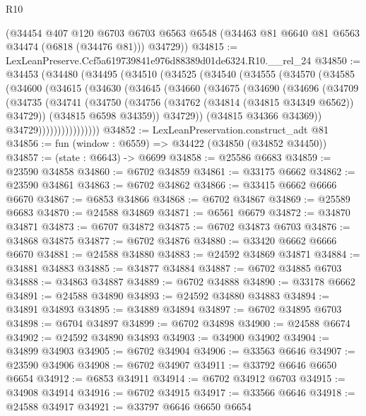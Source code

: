 \begin{lexlean}{R10}
\begin{coremodule}
      (@34454
        @407
        @120
        @6703
        @6703
        @6563
        @6548
        (@34463 @81 @6640 @81 @6563 @34474 (@6818 (@34476 @81)))
        @34729))
@34815 := LexLeanPreserve.Ccf5a619739841e976d88389d01de6324.R10.__rel_24
@34850 := @34453
    (@34480
      (@34495
        (@34510
          (@34525
            (@34540
              (@34555
                (@34570
                  (@34585
                    (@34600
                      (@34615
                        (@34630
                          (@34645
                            (@34660
                              (@34675
                                (@34690
                                  (@34696
                                    (@34709
                                      (@34735
                                        (@34741
                                          (@34750
                                            (@34756 (@34762 (@34814 (@34815 @34349 @6562)) @34729))
                                            (@34815 @6598 @34359))
                                          @34729))
                                      (@34815 @34366 @34369))
                                    @34729))))))))))))))))
@34852 := LexLeanPreservation.construct_adt @81
@34856 := fun (window : @6559) => @34422 (@34850 (@34852 @34450))
@34857 := (state : @6643) -> @6699
@34858 := @25586 @6683
@34859 := @23590 @34858
@34860 := @6702 @34859
@34861 := @33175 @6662
@34862 := @23590 @34861
@34863 := @6702 @34862
@34866 := @33415 @6662 @6666 @6670
@34867 := @6853 @34866
@34868 := @6702 @34867
@34869 := @25589 @6683
@34870 := @24588 @34869
@34871 := @6561 @6679
@34872 := @34870 @34871
@34873 := @6707 @34872
@34875 := @6702 @34873 @6703
@34876 := @34868 @34875
@34877 := @6702 @34876
@34880 := @33420 @6662 @6666 @6670
@34881 := @24588 @34880
@34883 := @24592 @34869 @34871
@34884 := @34881 @34883
@34885 := @34877 @34884
@34887 := @6702 @34885 @6703
@34888 := @34863 @34887
@34889 := @6702 @34888
@34890 := @33178 @6662
@34891 := @24588 @34890
@34893 := @24592 @34880 @34883
@34894 := @34891 @34893
@34895 := @34889 @34894
@34897 := @6702 @34895 @6703
@34898 := @6704 @34897
@34899 := @6702 @34898
@34900 := @24588 @6674
@34902 := @24592 @34890 @34893
@34903 := @34900 @34902
@34904 := @34899 @34903
@34905 := @6702 @34904
@34906 := @33563 @6646
@34907 := @23590 @34906
@34908 := @6702 @34907
@34911 := @33792 @6646 @6650 @6654
@34912 := @6853 @34911
@34914 := @6702 @34912 @6703
@34915 := @34908 @34914
@34916 := @6702 @34915
@34917 := @33566 @6646
@34918 := @24588 @34917
@34921 := @33797 @6646 @6650 @6654

\end{coremodule}
\end{lexlean}
